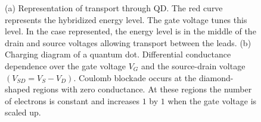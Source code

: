 \begin{figure}[t]
     \centering
    
     \caption{ \label{fig:QD-Trans} (a) Representation of transport through QD. The red curve represents the hybridized energy level. The gate voltage tunes this level. In the case represented, the energy level is in the middle of the drain and source voltages allowing transport between the leads. (b) Charging diagram of a quantum dot. Differential conductance dependence over the gate voltage $V_G$ and the source-drain voltage $(V_{SD}=V_{S}-V_{D} )$. Coulomb blockade occurs at the diamond-shaped regions with zero conductance. At these regions the number of electrons is constant and increases $1$ by $1$ when the gate voltage is scaled up.  \protect{}}
\end{figure}

